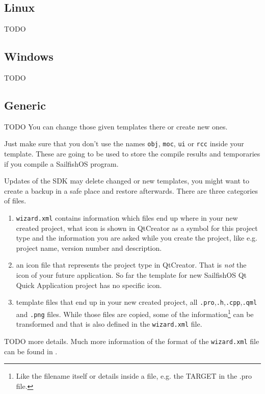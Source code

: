 \subsection{Linux}
%
TODO
%
%
\subsection{Windows}
TODO
%
%
%
\subsection{Generic}
TODO
%
You can change those given templates there or create new ones.

Just make sure that you don't use the names \verb,, \verb,obj,, \verb,moc,, \verb,ui, or \verb,rcc, inside your template. These are going to be used to store the compile results and temporaries if you compile a SailfishOS program.

Updates of the SDK may delete changed or new templates, you might want to create a backup in a safe place and restore afterwards.
There are three categories of files.
\begin{enumerate}
\item \verb,wizard.xml, contains information which files end up where in your new created project, what icon is shown in QtCreator as a symbol for this project type and the information you are asked while you create the project, like e.g. project name, version number and description.
\item an icon file that represents the project type in QtCreator. That is \emph{not} the icon of your future application. So far the template for new SailfishOS Qt Quick Application project has no specific icon. 
\item template files that end up in your new created project, all \verb,.pro,,\verb,.h,,\verb,.cpp,,\verb,.qml, and \verb,.png, files. While those files are copied, some of the information\footnote{Like the filename itself or details inside a file, e.g. the TARGET in the .pro file.} can be transformed and that is also defined in the \verb,wizard.xml, file.
\end{enumerate}
%
TODO more details.
%
Much more information of the format of the \verb,wizard.xml, file can be found in \cite{qt07}.
%